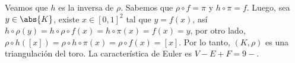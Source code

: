 \documentclass{article}
\begin{document}
\begin{enumerate}
    \vspace{2mm}
    \centerline{
    }
    Veamos que $h$ es la inversa de $\rho$. Sabemos que $\rho\circ f=\pi$ y $h\circ\pi=f$. Luego,
    sea $y\in\abs{K}$, existe $x\in[0,1]^{2}$ tal que $y=f(x)$, así 
    $h\circ\rho(y)=h\circ\rho\circ f(x)=h\circ\pi(x)=f(x)=y$, por otro lado, 
    $\rho\circ h([x])=\rho\circ h\circ\pi(x)=\rho\circ f(x)=[x]$. Por lo tanto, $(K,\rho)$ es una 
    triangulación del toro. La característica de Euler es $V-E+F=9-$.
\end{enumerate}

\end{document}
